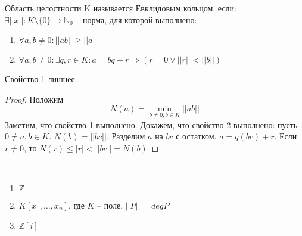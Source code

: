 \documentclass[document.tex]{subfiles}
\begin{document}
\begin{definition}
	Область целостности K называется Евклидовым кольцом, если: $\exists ||x|| : K \setminus \{0\} \mapsto \mathbb{N}_0$ -- норма, для которой выполнено:
	\begin{enumerate}
		\item $\forall a, b \neq 0: ||ab|| \geq ||a||$
		\item $\forall a, b \neq 0: \exists q, r \in K : a = bq+r \Rightarrow (r = 0 \vee ||r|| < ||b||)$
	\end{enumerate}
\end{definition}

\begin{statement}
	Свойство 1 лишнее.
\end{statement}

\begin{proof}
	Положим
	$$N(a) = \min_{b \neq 0, b \in K} ||ab||$$
	Заметим, что свойство 1 выполнено. Докажем, что свойство 2 выполнено: пусть $0 \neq a, b \in K$. $N(b) = ||bc||$. Разделим $a$ на $bc$ с остатком. $a = q(bc) + r$. Если $r \neq 0$, то $N(r) \leq |r| < ||bc|| = N(b)$
	
\end{proof}

\begin{example}
	~\begin{enumerate}
		\item $\mathbb{Z}$
		\item $K[x_1, \ldots, x_n]$, где $K$ -- поле, $||P|| = deg P$
		\item $\mathbb{Z}[i]$
	\end{enumerate}
\end{example}
\end{document}
